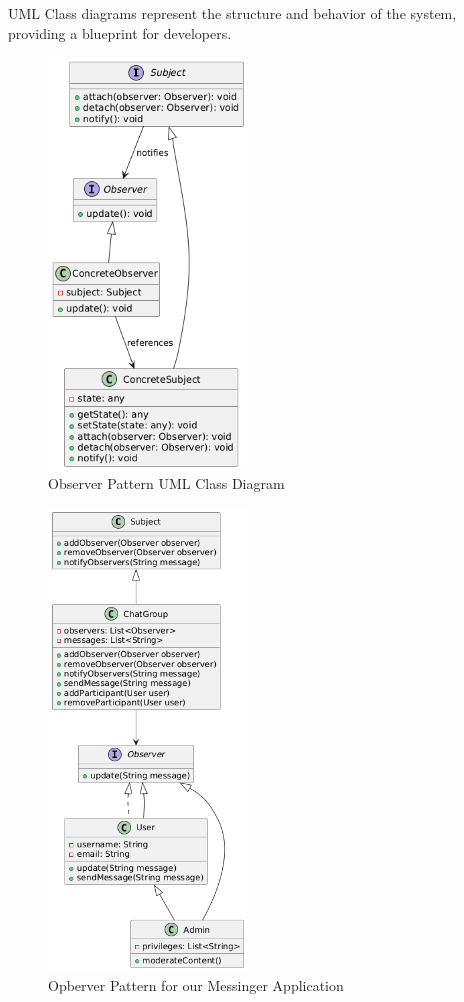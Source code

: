 UML Class diagrams represent the structure and behavior of the system, providing a blueprint for developers.
\begin{figure}[h]
    \centering
    \includegraphics[width=0.47\textwidth]{images/oberver_gen.png} %
    \caption{Observer Pattern UML Class Diagram}
    \label{fig:example}
\end{figure}
\begin{figure}[h]
    \centering
    \includegraphics[width=0.47\textwidth]{images/observer.png} %
    \caption{Opberver Pattern for our Messinger Application}
    \label{fig:example}
\end{figure}

